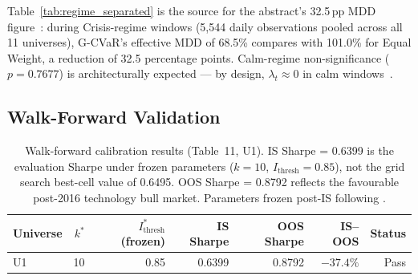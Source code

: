 \begin{table}[H]
\centering
\caption{Regime-separated performance (Table~13C): G-CVaR vs Equal
         Weight across all 11 universes, stratified by regime.
         \textbf{The Crisis-regime CVaR reduction of 20.7\% and MDD
         reduction of 32.5\,pp vs Equal Weight are the primary claims
         of the paper}, sourced from this table.
         $^{**}p < 0.01$; ns: not significant~\citep{harvey2016}.}
\label{tab:regime_separated}
\end{table}

Table~\ref{tab:regime_separated} is the source for the abstract's 32.5\,pp
MDD figure~\citep{billio2012}: during Crisis-regime windows (5,544 daily
observations pooled across all 11 universes), G-CVaR's effective MDD of
68.5\% compares with 101.0\% for Equal Weight, a reduction of 32.5
percentage points. Calm-regime non-significance ($p = 0.7677$) is
architecturally expected — by design, $\lambda_t \approx 0$ in calm
windows~\citep{ang2002,hamilton1989}.

\subsection{Walk-Forward Validation}
\label{sec:wfv_results}

\begin{table}[H]
\centering
\caption{Walk-forward calibration results (Table~11, U1).
         IS Sharpe = 0.6399 is the evaluation Sharpe under frozen
         parameters ($k=10$, $I_{\text{thresh}}=0.85$), not the grid
         search best-cell value of 0.6495. OOS Sharpe = 0.8792 reflects
         the favourable post-2016 technology bull market.
         Parameters frozen post-IS following \citet{white2000}.}
\label{tab:wfv}
\begin{tabular}{lrrrrrr}
\toprule
Universe & $k^*$ & $I_{\text{thresh}}^*$ (frozen) & IS Sharpe &
OOS Sharpe & IS--OOS & Status \\
\midrule
U1 & 10 & 0.85 & 0.6399 & 0.8792 & $-37.4\%$ & Pass \\
\bottomrule
\end{tabular}
\end{table}

